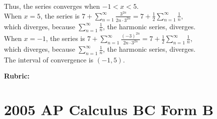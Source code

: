 \documentclass[12pt,addpoints,answers]{exam}
\begin{document}
\begin{questions}
\begin{solution}
\begin{parts}
Thus, the series converges when $-1<x<5$.\\
When $x=5$, the series is $7+\sum_{n=1}^{\infty} \frac{3^{2 n}}{2 n \cdot 3^{2 n}}=7+\frac{1}{2} \sum_{n=1}^{\infty} \frac{1}{n}$,\\
which diverges, because $\sum_{n=1}^{\infty} \frac{1}{n}$, the harmonic series, diverges.\\
When $x=-1$, the series is $7+\sum_{n=1}^{\infty} \frac{(-3)^{2 n}}{2 n \cdot 3^{2 n}}=7+\frac{1}{2} \sum_{n=1}^{\infty} \frac{1}{n}$,\\
which diverges, because $\sum_{n=1}^{\infty} \frac{1}{n}$, the harmonic series, diverges.\\
The interval of convergence is $(-1,5)$.
\end{parts}
\par\medskip
\textbf{Rubric:}\par
{}
\end{solution}

\end{questions}

\section*{2005 AP Calculus BC Form B}
\end{document}
